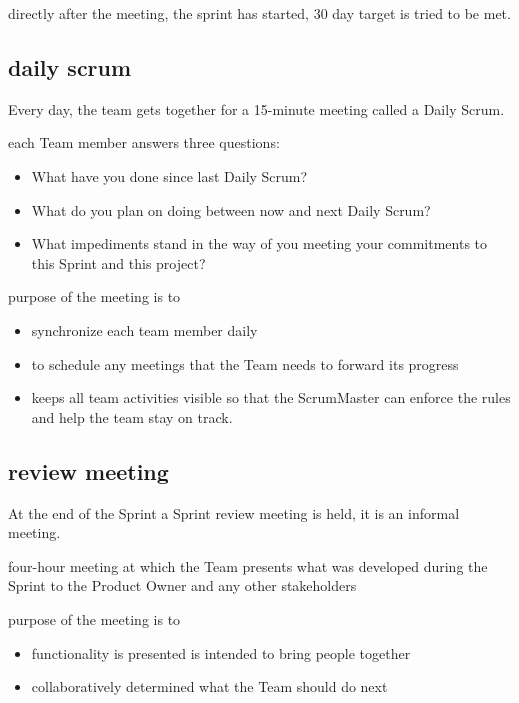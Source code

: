 directly after the meeting, the sprint has started, 30 day target is tried to be met.



\subsection*{daily scrum}

Every day, the team gets together for a 15-minute meeting called a Daily Scrum.

each Team member answers three questions:

\begin{itemize}
  \item What have you done since last Daily Scrum?
  \item What do you plan on doing between now and next Daily Scrum?
  \item What impediments stand in the way of you meeting your commitments to this Sprint and this project? 
\end{itemize}

purpose of the meeting is to
\begin{itemize}
  \item synchronize each team member daily
  \item to schedule any meetings that the Team needs to forward its progress
  \item keeps all team activities visible so that the ScrumMaster can enforce the rules and help the team stay on track.
\end{itemize}



\subsection*{review meeting}

At the end of the Sprint a Sprint review meeting is held, it is an informal meeting.

four-hour meeting at which the Team presents what was developed during the Sprint to the Product Owner and any other stakeholders

purpose of the meeting is to
\begin{itemize}
  \item functionality is presented is intended to bring people together
  \item collaboratively determined what the Team should do next
\end{itemize}


